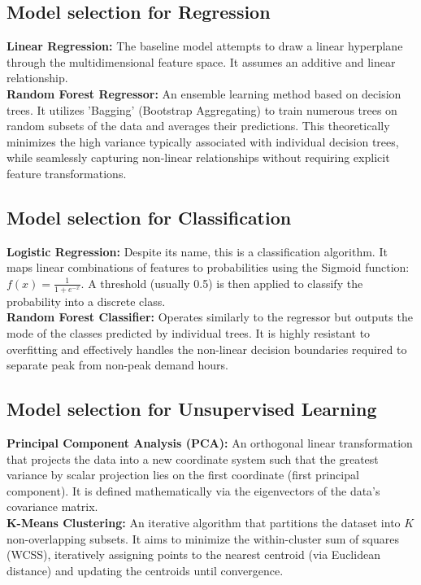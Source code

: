 \documentclass[12pt,a4paper]{article}
\begin{document}
\subsection{Model selection for Regression}
\textbf{Linear Regression:} The baseline model attempts to draw a linear hyperplane through the multidimensional feature space. It assumes an additive and linear relationship.
\\
\textbf{Random Forest Regressor:} An ensemble learning method based on decision trees. It utilizes 'Bagging' (Bootstrap Aggregating) to train numerous trees on random subsets of the data and averages their predictions. This theoretically minimizes the high variance typically associated with individual decision trees, while seamlessly capturing non-linear relationships without requiring explicit feature transformations.

\subsection{Model selection for Classification}
\textbf{Logistic Regression:} Despite its name, this is a classification algorithm. It maps linear combinations of features to probabilities using the Sigmoid function: $f(x) = \frac{1}{1 + e^{-x}}$. A threshold (usually 0.5) is then applied to classify the probability into a discrete class.
\\
\textbf{Random Forest Classifier:} Operates similarly to the regressor but outputs the mode of the classes predicted by individual trees. It is highly resistant to overfitting and effectively handles the non-linear decision boundaries required to separate peak from non-peak demand hours.

\subsection{Model selection for Unsupervised Learning}
\textbf{Principal Component Analysis (PCA):} An orthogonal linear transformation that projects the data into a new coordinate system such that the greatest variance by scalar projection lies on the first coordinate (first principal component). It is defined mathematically via the eigenvectors of the data's covariance matrix.
\\
\textbf{K-Means Clustering:} An iterative algorithm that partitions the dataset into $K$ non-overlapping subsets. It aims to minimize the within-cluster sum of squares (WCSS), iteratively assigning points to the nearest centroid (via Euclidean distance) and updating the centroids until convergence.
\end{document}

